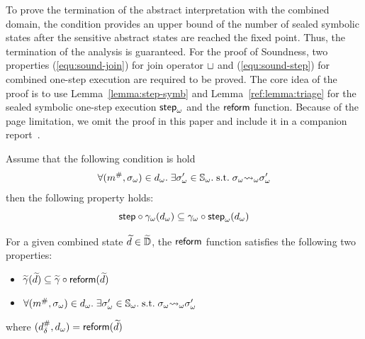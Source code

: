 To prove the termination of the abstract interpretation with the combined
domain, the condition provides an upper bound of the number of sealed symbolic
states after the sensitive abstract states are reached the fixed point.  Thus,
the termination of the analysis is guaranteed.  For the proof of Soundness, two
properties (\ref{equ:sound-join}) for join operator $\sqcup$ and
(\ref{equ:sound-step}) for combined one-step execution are required to be
proved.  The core idea of the proof is to use Lemma~\ref{lemma:step-symb} and
Lemma~\ref{ref:lemma:triage} for the sealed symbolic one-step execution
${\textsf{step}}_\omega$ and the $\textsf{reform}$ function. Because of the page limitation, we omit
the proof in this paper and include it in a companion report~\cite{report}.
\begin{lemma}\label{lemma:step-symb}
  Assume that the following condition is hold
  \[
    \forall ({m}^{\#}, {\sigma}_\omega) \in {{d}_\omega}. \; \exists {\sigma}_\omega' \in
    {\mathbb{S}}_\omega. \; \text{s.t.} \; {\sigma}_\omega {\leadsto}_\omega {\sigma}_\omega'
  \]
  then the following property holds:
  \[
    \textsf{step} \circ {\gamma}_\omega({{d}_\omega}) \subseteq
    {\gamma}_\omega \circ {\textsf{step}}_\omega({{d}_\omega})\\
  \]
\end{lemma}
\begin{lemma}\label{lemma:triage}
  For a given combined state $\widetilde{d} \in \widetilde{\mathbb{D}}$, the $\textsf{reform}$ function
  satisfies the following two properties:
  \begin{itemize}
    \item $\widetilde{\gamma}(\widetilde{d}) \subseteq \widetilde{\gamma} \circ \textsf{reform}(\widetilde{d})$
    \item $\forall ({m}^{\#}, {\sigma}_\omega) \in {{d}_\omega}. \; \exists {\sigma}_\omega' \in
      {\mathbb{S}}_\omega.  \; \text{s.t.} \; {\sigma}_\omega {\leadsto}_\omega {\sigma}_\omega'$
  \end{itemize}
  where $({{d}^{\#}_\delta}, {{d}_\omega}) = \textsf{reform}(\widetilde{d})$
\end{lemma}
